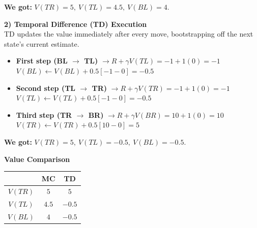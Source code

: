 \textbf{We got:} $V(TR)=5, \ V(TL)=4.5, \ V(BL)=4$.

\vspace{0.5cm}

\textbf{\textcolor{primary}{2) Temporal Difference (TD) Execution}} \\
TD updates the value immediately after every move, bootstrapping off the next state's current estimate.

\begin{itemize}
    \item \textbf{First step (BL $\rightarrow$ TL)} $\rightarrow R + \gamma V(TL) = -1 + 1(0) = -1$ \\
    $V(BL) \leftarrow V(BL) + 0.5[-1 - 0] = -0.5$
    \item \textbf{Second step (TL $\rightarrow$ TR)} $\rightarrow R + \gamma V(TR) = -1 + 1(0) = -1$ \\
    $V(TL) \leftarrow V(TL) + 0.5[-1 - 0] = -0.5$
    \item \textbf{Third step (TR $\rightarrow$ BR)} $\rightarrow R + \gamma V(BR) = 10 + 1(0) = 10$ \\
    $V(TR) \leftarrow V(TR) + 0.5[10 - 0] = 5$
\end{itemize}

\textbf{We got:} $V(TR)=5, \ V(TL)=-0.5, \ V(BL)=-0.5$.

\vspace{0.5cm}

\textbf{\textcolor{primary}{Value Comparison}} \\
\begin{table}[h!]
\centering
\renewcommand{\arraystretch}{1.5}
\begin{tabular}{|c|c|c|}
\hline
& \textbf{MC} & \textbf{TD} \\ \hline
\textbf{$V(TR)$} & $5$ & $5$ \\ \hline
\textbf{$V(TL)$} & $4.5$ & $-0.5$ \\ \hline
\textbf{$V(BL)$} & $4$ & $-0.5$ \\ \hline
\end{tabular}
\end{table}